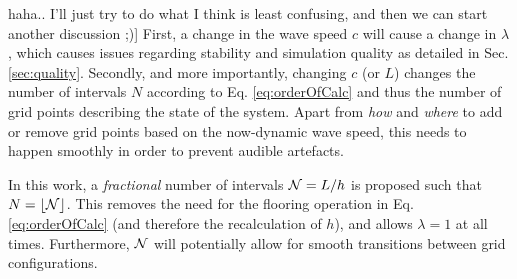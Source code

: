 \documentclass[fleqn]{jaes}
\begin{document}
haha.. I'll just try to do what I think is least confusing, and then we can start another discussion ;)] First, a change in the wave speed $c$ will cause a change in $\lambda$, which causes issues regarding stability and simulation quality as detailed in Sec. \ref{sec:quality}. Secondly, and more importantly, changing $c$ (or $L$) changes the number of intervals $N$ according to Eq. \eqref{eq:orderOfCalc} and thus the number of grid points describing the state of the system. Apart from \textit{how} and \textit{where} to add or remove grid points based on the now-dynamic wave speed, this needs to happen smoothly in order to prevent audible artefacts. %

In this work, a \textit{fractional} number of intervals $\mathcal{N} = L / h$ is proposed such that $N = \floor[\Nfrac]$. This removes the need for the flooring operation in Eq. \eqref{eq:orderOfCalc} (and therefore the recalculation of $h$), and allows $\lambda = 1$ at all times. Furthermore, $\mathcal{N}$ will potentially allow for smooth transitions between grid configurations. 
\end{document}
